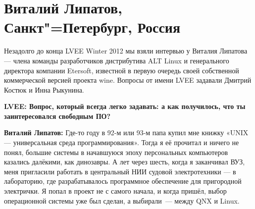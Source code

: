 \documentclass[10pt, a5paper]{article}
\begin{document}



\section{Виталий Липатов, Санкт"=Петербург, Россия}

Незадолго до конца LVEE Winter 2012 мы взяли интервью у Виталия Липатова --- члена команды разработчиков  дистрибутива ALT Linux и генерального директора компании Etersoft, известной в первую очередь своей собственной коммерческой версией проекта wine. Вопросы от имени LVEE задавали Дмитрий Костюк и Инна Рыкунина.

{\noindent \bf LVEE: Вопрос, который всегда легко задавать: а как получилось, что ты заинтересовался свободным ПО?}

{\noindent \bf Виталий Липатов:} Где-то году в 92-м или 93-м папа купил мне книжку «UNIX --- универсальная среда программирования». Тогда я её прочитал и ничего не понял, большие системы в начавшуюся эпоху персональных компьютеров казались далёкими, как динозавры. А лет через шесть, когда я заканчивал ВУЗ, меня пригласили работать в центральный НИИ судовой электротехники --- в лабораторию, где разрабатывалось программное обеспечение для пригородной электрички. Я попал в проект не с самого начала, и когда пришёл, выбор операционной системы уже был сделан, а выбирали~--- между QNX и Linux. 
\end{document}
